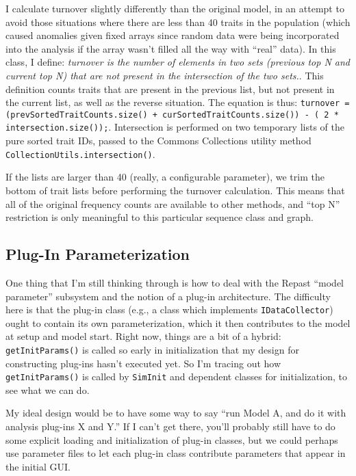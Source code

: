 \documentclass{kluwer-mem-copyright}
\begin{document}
\begin{article}
I calculate turnover slightly differently than the original model, in an attempt
to avoid those situations where there are less than 40 traits in the population
(which caused anomalies given fixed arrays since random data were being
incorporated into the analysis if the array wasn't filled all the way with
``real'' data).  In this class, I define:  \emph{turnover is the number of
elements in two sets (previous top N and current top N) that are not present in
the intersection of the two sets.}.  This definition counts traits that are
present in the previous list, but not present in the current list, as well as
the reverse situation.  The equation is thus:  
\texttt{turnover = (prevSortedTraitCounts.size() + curSortedTraitCounts.size())
- ( 2 * intersection.size());}.  Intersection is performed on two temporary
lists of the pure sorted trait IDs, passed to the Commons Collections utility
method\\ \texttt{CollectionUtils.intersection()}.  

If the lists are larger than 40 (really, a configurable parameter), we trim the
bottom of trait lists before performing the turnover calculation.  This means
that all of the original frequency counts are available to other methods, and
``top N'' restriction is only meaningful to this particular sequence class and graph.


\subsection{Plug-In Parameterization}
One thing that I'm still thinking through is how to deal with the Repast ``model
parameter'' subsystem and the notion of a plug-in architecture.  The difficulty
here is that the plug-in class (e.g., a class which implements
\texttt{IDataCollector}) ought to contain its own parameterization, which it
then contributes to the model at setup and model start.  Right now, things are a
bit of a hybrid:  \texttt{getInitParams()} is called so early in initialization
that my design for constructing plug-ins hasn't executed yet.  So I'm tracing
out how \texttt{getInitParams()} is called by \texttt{SimInit} and dependent
classes for initialization, to see what we can do.  

My ideal design would be to have some way to say ``run Model A, and do it with
analysis plug-ins X and Y.''  If I can't get there, you'll probably still have
to do some explicit loading and initialization of plug-in classes, but we could
perhaps use parameter files to let each plug-in class contribute parameters that
appear in the initial GUI.  


\end{article}
\end{document}
